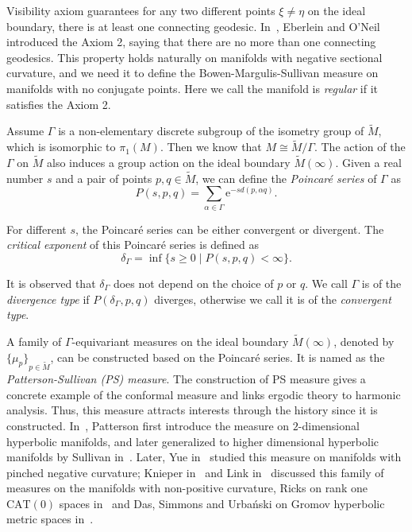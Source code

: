 \documentclass[reqno,11pt]{article}
\theoremstyle{definition}
\theoremstyle{remark}
\numberwithin{equation}{section}
\begin{document}
Visibility axiom guarantees for any two different points $\xi\neq\eta$ on the ideal boundary, there is at least one connecting geodesic. In~\cite{Eb3}, Eberlein and O'Neil introduced the Axiom 2, saying that there are no more than one connecting geodesics. This property holds naturally on manifolds with negative sectional curvature, and we need it to define the Bowen-Margulis-Sullivan measure on manifolds with no conjugate points. Here we call the manifold is \emph{regular} if it satisfies the Axiom 2.

Assume $\Gamma$ is a non-elementary discrete subgroup of the isometry group of $\widetilde{M}$, which is isomorphic to $\pi_1(M)$. Then we know that  $M\cong\widetilde{M}/\Gamma$. The action of the $\Gamma$ on $\widetilde{M}$ also induces a group action on the ideal boundary $\widetilde{M}(\infty)$. Given a real number $s$ and a pair of points $p,q \in \widetilde{M}$, we can define the \emph{Poincar\'e series} of $\Gamma$ as
\begin{displaymath}
	P(s,p,q)=\sum_{\alpha\in\Gamma}\mathrm{e}^{-s d(p,\alpha q)}.
\end{displaymath}

For different $s$, the Poincar\'e series can be either convergent or divergent. The \emph{critical exponent} of this Poincar\'e series is defined as
\begin{displaymath}
	\delta_\Gamma=\inf\{s\geq 0\mid P(s,p,q)<\infty\}.
\end{displaymath}

It is observed that $\delta_\Gamma$ does not depend on the choice of $p$ or $q$. We call $\Gamma$ is of the \emph{divergence type} if $P(\delta_\Gamma,p,q)$ diverges, otherwise we call it is of the \emph{convergent type}.

A family of $\Gamma$-equivariant measures on the ideal boundary $\widetilde{M}(\infty)$, denoted by ${\{\mu_p\}}_{p\in \widetilde{M}}$, can be constructed based on the Poincar\'e series. It is named as the \emph{Patterson-Sullivan (PS) measure}. The construction of PS measure gives a concrete example of the conformal measure and links ergodic theory to harmonic analysis. Thus, this measure attracts interests through the history since it is constructed. In~\cite{Pa2}, Patterson first introduce the measure on $2$-dimensional hyperbolic manifolds, and later generalized to higher dimensional hyperbolic manifolds by Sullivan in~\cite{Su2}. Later, Yue in~\cite{Yue1} studied this measure on manifolds with pinched negative curvature; Knieper in~\cite{Kn4} and Link in~\cite{Li} discussed this family of measures on the manifolds with non-positive curvature, Ricks on rank one $\text{CAT}(0)$ spaces in~\cite{Ri2} and Das, Simmons and Urba\'{n}ski on Gromov hyperbolic metric spaces in~\cite{DDU}. 
\end{document}
